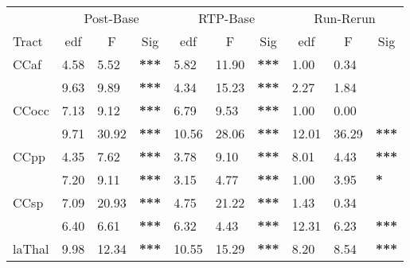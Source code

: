
\begin{tabular}{llll|llllll}
 & \multicolumn{3}{c|}{Post-Base} & \multicolumn{3}{c|}{RTP-Base} & \multicolumn{3}{c}{Run-Rerun} \\ \cline{2-10}
Tract & \multicolumn{1}{c}{edf} & \multicolumn{1}{c}{F} & \multicolumn{1}{c|}{Sig} & \multicolumn{1}{c}{edf} & \multicolumn{1}{c}{F} & \multicolumn{1}{c|}{Sig} & \multicolumn{1}{c}{edf} & \multicolumn{1}{c}{F} & \multicolumn{1}{c}{Sig} \\ \hline
\multicolumn{1}{l|}{CCaf} & 4.58 & 5.52 & \textbf{***} & 5.82 & 11.90 & \multicolumn{1}{l|}{\textbf{***}} & 1.00 & 0.34 & \textbf{} \\
\rowcolor[HTML]{C0C0C0}
\multicolumn{1}{l|}{\cellcolor[HTML]{C0C0C0}CCmot} & 9.63 & 9.89 & \textbf{***} & 4.34 & 15.23 & \multicolumn{1}{l|}{\cellcolor[HTML]{C0C0C0}\textbf{***}} & 2.27 & 1.84 & \textbf{} \\
\multicolumn{1}{l|}{CCocc} & 7.13 & 9.12 & \textbf{***} & 6.79 & 9.53 & \multicolumn{1}{l|}{\textbf{***}} & 1.00 & 0.00 & \textbf{} \\
\rowcolor[HTML]{C0C0C0}
\multicolumn{1}{l|}{\cellcolor[HTML]{C0C0C0}CCorb} & 9.71 & 30.92 & \textbf{***} & 10.56 & 28.06 & \multicolumn{1}{l|}{\cellcolor[HTML]{C0C0C0}\textbf{***}} & 12.01 & 36.29 & \textbf{***} \\
\multicolumn{1}{l|}{CCpp} & 4.35 & 7.62 & \textbf{***} & 3.78 & 9.10 & \multicolumn{1}{l|}{\textbf{***}} & 8.01 & 4.43 & \textbf{***} \\
\rowcolor[HTML]{C0C0C0}
\multicolumn{1}{l|}{\cellcolor[HTML]{C0C0C0}CCsf} & 7.20 & 9.11 & \textbf{***} & 3.15 & 4.77 & \multicolumn{1}{l|}{\cellcolor[HTML]{C0C0C0}\textbf{***}} & 1.00 & 3.95 & \textbf{*} \\
\multicolumn{1}{l|}{CCsp} & 7.09 & 20.93 & \textbf{***} & 4.75 & 21.22 & \multicolumn{1}{l|}{\textbf{***}} & 1.43 & 0.34 & \textbf{} \\
\rowcolor[HTML]{C0C0C0}
\multicolumn{1}{l|}{\cellcolor[HTML]{C0C0C0}CCtemp} & 6.40 & 6.61 & \textbf{***} & 6.32 & 4.43 & \multicolumn{1}{l|}{\cellcolor[HTML]{C0C0C0}\textbf{***}} & 12.31 & 6.23 & \textbf{***} \\
\multicolumn{1}{l|}{laThal} & 9.98 & 12.34 & \textbf{***} & 10.55 & 15.29 & \multicolumn{1}{l|}{\textbf{***}} & 8.20 & 8.54 & \textbf{***} \\

\end{tabular}
